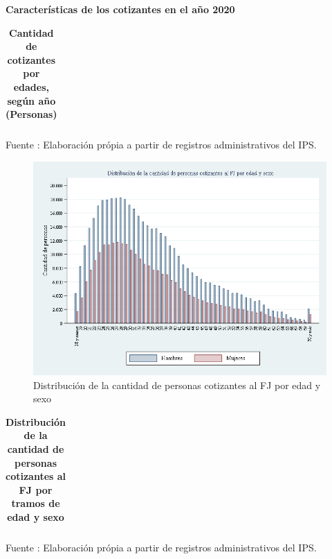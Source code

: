 \textbf{Características de los cotizantes en el año 2020}

\begin{table}[H]
\begin{center}
\scriptsize
\caption{\bf{Cantidad de cotizantes por edades, según año (Personas)}}
\begin{tabular}{l|rrrrrrrrrrrrr}

\end{tabular}
                            \item Fuente : Elaboración própia a partir de registros administrativos del IPS.
\end{center}
\end{table}

\begin{figure}[H]
\begin{center}
                    \caption{Distribución de la cantidad de personas cotizantes al FJ por edad y sexo}
                    \vspace{0.5cm}
                    \includegraphics[scale=0.4]{RA_IPS_cotizantes_2020_sexo_edad_18a70.png}
\end{center}
\end{figure}

\begin{table}[H]
\begin{center}
\scriptsize
\caption{\bf{Distribución de la cantidad de personas cotizantes al FJ por tramos de edad y sexo}}
\begin{tabular}{l|rrrrrrrrrrrrr}

\end{tabular}
                    \item Fuente : Elaboración própia a partir de registros administrativos del IPS.
\end{center}
\end{table}

